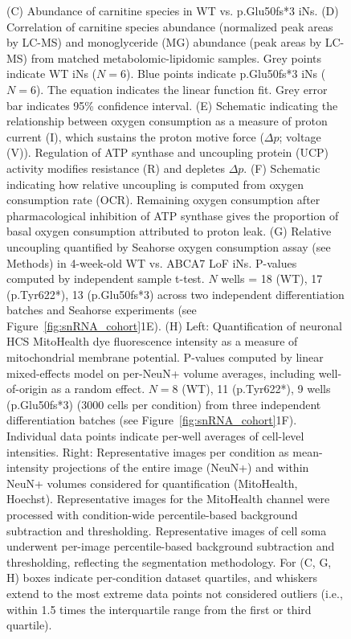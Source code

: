 \begin{figure}[ht]
{        (C) Abundance of carnitine species in WT vs. p.Glu50fs*3 iNs. 
        (D) Correlation of carnitine species abundance (normalized peak areas by LC-MS) and monoglyceride (MG) abundance (peak areas by LC-MS) from matched metabolomic-lipidomic samples. Grey points indicate WT iNs ($N=6$). Blue points indicate p.Glu50fs*3 iNs ($N=6$). The equation indicates the linear function fit. Grey error bar indicates 95\% confidence interval. 
        (E) Schematic indicating the relationship between oxygen consumption as a measure of proton current (I), which sustains the proton motive force ($\Delta p$; voltage (V)). Regulation of ATP synthase and uncoupling protein (UCP) activity modifies resistance (R) and depletes $\Delta p$. 
        (F) Schematic indicating how relative uncoupling is computed from oxygen consumption rate (OCR). Remaining oxygen consumption after pharmacological inhibition of ATP synthase gives the proportion of basal oxygen consumption attributed to proton leak. 
        (G) Relative uncoupling quantified by Seahorse oxygen consumption assay (see Methods) in 4-week-old WT vs. ABCA7 LoF iNs. P-values computed by independent sample t-test. $N$ wells = 18 (WT), 17 (p.Tyr622*), 13 (p.Glu50fs*3) across two independent differentiation batches and Seahorse experiments (see Figure~\ref{fig:snRNA_cohort}1E). 
        (H) Left: Quantification of neuronal HCS MitoHealth dye fluorescence intensity as a measure of mitochondrial membrane potential. P-values computed by linear mixed-effects model on per-NeuN+ volume averages, including well-of-origin as a random effect. $N=8$ (WT), 11 (p.Tyr622*), 9 wells (p.Glu50fs*3) (3000 cells per condition) from three independent differentiation batches (see Figure~\ref{fig:snRNA_cohort}1F). Individual data points indicate per-well averages of cell-level intensities. Right: Representative images per condition as mean-intensity projections of the entire image (NeuN+) and within NeuN+ volumes considered for quantification (MitoHealth, Hoechst). Representative images for the MitoHealth channel were processed with condition-wide percentile-based background subtraction and thresholding. Representative images of cell soma underwent per-image percentile-based background subtraction and thresholding, reflecting the segmentation methodology. For (C, G, H) boxes indicate per-condition dataset quartiles, and whiskers extend to the most extreme data points not considered outliers (i.e., within 1.5 times the interquartile range from the first or third quartile). 
    }
    \label{fig:main_mitochondrial}
\end{figure}